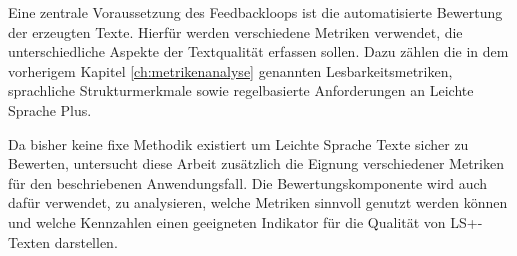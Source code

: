
Eine zentrale Voraussetzung des Feedbackloops ist die automatisierte Bewertung der erzeugten Texte.
Hierfür werden verschiedene Metriken verwendet, die unterschiedliche Aspekte der Textqualität erfassen sollen.
Dazu zählen die in dem vorherigem Kapitel \ref{ch:metrikenanalyse} genannten Lesbarkeitsmetriken, sprachliche Strukturmerkmale sowie regelbasierte Anforderungen an Leichte Sprache Plus.

Da bisher keine fixe Methodik existiert um Leichte Sprache Texte sicher zu Bewerten, untersucht diese Arbeit zusätzlich die Eignung verschiedener Metriken für den beschriebenen Anwendungsfall.
Die Bewertungskomponente wird auch dafür verwendet, zu analysieren, welche Metriken sinnvoll genutzt werden können und welche Kennzahlen einen geeigneten Indikator für die Qualität von LS+-Texten darstellen.
